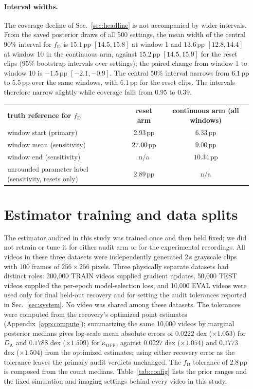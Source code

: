 \documentclass{article}
\newcommand{\fD}{f_{\mathrm{D}}}
\newcommand{\DA}{D_{\mathrm{A}}}
\newcommand{\koff}{\kappa_{\mathrm{OFF}}}
\newcommand{\pp}{\,\mathrm{pp}}
\begin{document}
\paragraph{Interval widths.} The coverage decline of Sec.~\ref{sec:headline}
is not accompanied by wider intervals. From the saved posterior draws of all
500 settings, the mean width of the central 90\% interval for $\fD$ is
$15.1\pp$ $[14.5,15.8]$ at window 1 and $13.6\pp$ $[12.8,14.4]$ at window 10
in the continuous arm, against $15.2\pp$ $[14.5,15.9]$ for the reset clips
(95\% bootstrap intervals over settings); the paired change from window 1 to
window 10 is $-1.5\pp$ $[-2.1,-0.9]$. The central 50\% interval narrows
from $6.1\pp$ to $5.5\pp$ over the same windows, with $6.1\pp$ for the reset
clips. The intervals therefore narrow slightly while coverage falls from
$0.95$ to $0.39$.

\begin{table}[h]
\centering
\small
\begin{tabular}{lcc}
\toprule
truth reference for $\fD$ & reset arm & continuous arm (all windows) \\
\midrule
window start (primary) & $2.93\pp$ & $6.33\pp$ \\
window mean (sensitivity) & $27.00\pp$ & $9.00\pp$ \\
window end (sensitivity) & n/a & $10.34\pp$ \\
unrounded parameter label (sensitivity, resets only) & $2.89\pp$ & n/a \\
\bottomrule
\end{tabular}
\end{table}

\section{Estimator training and data splits}
\label{app:training}

The estimator audited in this study was trained once and then held fixed; we
did not retrain or tune it for either audit arm or for the experimental
recordings. All videos in these three datasets were independently generated
2\,s grayscale clips with 100 frames of $256\times256$ pixels.
Three physically separate datasets had distinct roles: 200,000 TRAIN videos
supplied gradient updates, 50,000 TEST videos supplied the per-epoch
model-selection loss, and 10,000 EVAL videos were used only for final
held-out recovery and for setting the audit tolerances reported in
Sec.~\ref{sec:system}. No video was shared among these datasets. The
tolerances were computed from the recovery's optimized point estimates
(Appendix~\ref{app:compute}); summarizing the same 10,000 videos by marginal
posterior medians gives log-scale mean absolute errors of $0.0222$ dex
($\times1.053$) for $\DA$ and $0.1788$ dex ($\times1.509$) for $\koff$,
against $0.0227$ dex ($\times1.054$) and $0.1773$ dex ($\times1.504$) from
the optimized estimates; using either recovery error as the tolerance leaves
the primary audit verdicts unchanged. The $\fD$ tolerance of $2.8\pp$ is composed from the count
medians. Table~\ref{tab:config} lists the prior ranges and the fixed
simulation and imaging settings behind every video in this study.
\end{document}
